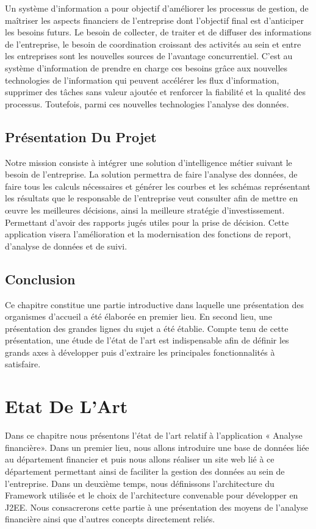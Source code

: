 \documentclass[a4paper,10pt]{article}
\begin{document}
Un système d'information a pour objectif d'améliorer les processus de gestion, de maîtriser les aspects financiers de l'entreprise dont l'objectif final est d'anticiper les besoins futurs. Le besoin de collecter, de traiter et de diffuser des informations de l'entreprise, le besoin de coordination croissant des activités au sein et entre les entreprises sont les nouvelles sources de l'avantage concurrentiel. C'est au système d'information de prendre en charge ces besoins grâce aux nouvelles technologies de l'information qui peuvent accélérer les flux d'information, supprimer des tâches sans valeur ajoutée et renforcer la fiabilité et la qualité des processus. Toutefois, parmi ces nouvelles technologies l'analyse des données.

\subsection{Présentation Du Projet}

Notre mission consiste à intégrer une solution d'intelligence métier suivant le besoin de l'entreprise. La solution permettra de faire l’analyse des données, de faire tous les calculs nécessaires et générer les courbes et les schémas représentant les résultats que le responsable de l’entreprise veut consulter afin de mettre en œuvre les meilleures décisions, ainsi la meilleure stratégie d'investissement. Permettant d’avoir des rapports jugés utiles pour la prise de décision. Cette application visera l'amélioration et la modernisation des fonctions de report, d'analyse de données et de suivi.

\subsection{Conclusion}

Ce chapitre constitue une partie introductive dans laquelle une présentation des organismes d'accueil a été élaborée en premier lieu. En second lieu, une présentation des grandes lignes du sujet a été établie. Compte tenu de cette présentation, une étude de l'état de l'art est indispensable afin de définir les grands axes à développer puis d'extraire les principales fonctionnalités à satisfaire.

\newpage
\section{Etat De L'Art}

Dans ce chapitre nous présentons l'état de l'art relatif à l'application « Analyse financière». Dans un premier lieu, nous allons introduire une base de données liée au département financier et puis nous allons réaliser un site web lié à ce département permettant ainsi de faciliter la gestion des données au sein de l’entreprise. Dans un deuxième temps, nous définissons l’architecture du Framework utilisée et le choix de l’architecture convenable  pour développer en J2EE. Nous consacrerons cette partie à une présentation des moyens de l’analyse financière ainsi que d'autres concepts directement reliés.
\end{document}
